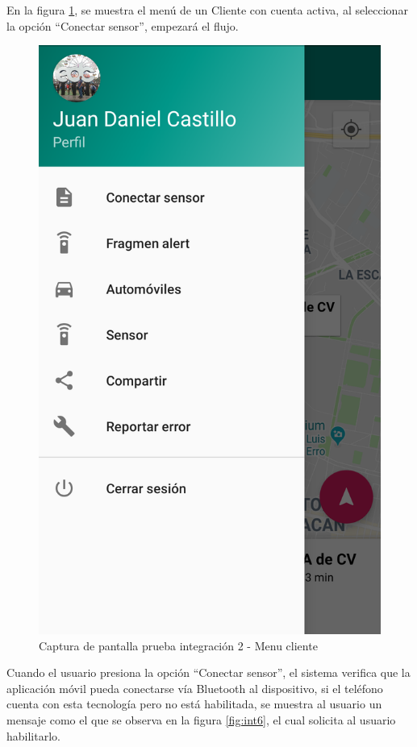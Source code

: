 En la figura \ref{fig:int5}, se muestra el menú de un Cliente con cuenta activa, al seleccionar la opción ``Conectar sensor'', empezará el flujo.

\begin{figure}[H]
	\centering
	\includegraphics[scale=.2]{DocumentoTecnico/Capitulo6/integracion/Software/images/5.png}
	\caption{Captura de pantalla prueba integración 2 - Menu cliente}
	\label{fig:int5}
\end{figure}

Cuando el usuario presiona la opción ``Conectar sensor'', el sistema verifica que la aplicación móvil pueda conectarse vía Bluetooth al dispositivo, si el teléfono cuenta con esta tecnología pero no está habilitada, se muestra al usuario un mensaje como el que se observa en la figura \ref{fig:int6}, el cual solicita al usuario habilitarlo.

